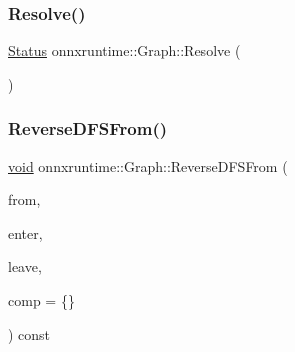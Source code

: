 \mbox{\label{classonnxruntime_1_1Graph_a339e752e0557c49da5e81e9fa8e3cb54}} 
\subsubsection{\texorpdfstring{Resolve()}{Resolve()}}
{\footnotesize\ttfamily \mbox{\hyperlink{classonnxruntime_1_1common_1_1Status}{Status}} onnxruntime\+::\+Graph\+::\+Resolve (\begin{DoxyParamCaption}{ }\end{DoxyParamCaption})\hspace{0.3cm}{\ttfamily [virtual]}}

\mbox{\label{classonnxruntime_1_1Graph_a1b4379710f3916fd237e2692c130ddd5}} 
\subsubsection{\texorpdfstring{Reverse\+D\+F\+S\+From()}{ReverseDFSFrom()}\hspace{0.1cm}{\footnotesize\ttfamily [1/2]}}
{\footnotesize\ttfamily \mbox{\hyperlink{mlasi_8h_a88f941d423cb2a819b70a1358982b1a6}{void}} onnxruntime\+::\+Graph\+::\+Reverse\+D\+F\+S\+From (\begin{DoxyParamCaption}\item[{const std\+::vector$<$ \mbox{\hyperlink{namespaceonnxruntime_af8773b5c12b5d8fd9292eb2e268df760}{Node\+Index}} $>$ \&}]{from,  }\item[{const std\+::function$<$ \mbox{\hyperlink{mlasi_8h_a88f941d423cb2a819b70a1358982b1a6}{void}}(const \mbox{\hyperlink{classonnxruntime_1_1Node}{Node}} $\ast$)$>$ \&}]{enter,  }\item[{const std\+::function$<$ \mbox{\hyperlink{mlasi_8h_a88f941d423cb2a819b70a1358982b1a6}{void}}(const \mbox{\hyperlink{classonnxruntime_1_1Node}{Node}} $\ast$)$>$ \&}]{leave,  }\item[{const std\+::function$<$ bool(const \mbox{\hyperlink{classonnxruntime_1_1Node}{Node}} $\ast$, const \mbox{\hyperlink{classonnxruntime_1_1Node}{Node}} $\ast$)$>$ \&}]{comp = {\ttfamily \{\}} }\end{DoxyParamCaption}) const}

